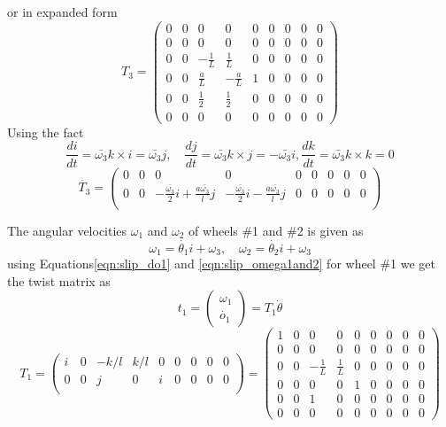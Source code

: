 {or in expanded form
\begin{equation}
\label{eqn:slip_T3}
T_3=\left(
\begin{array}{ccccccccc}
0 & 0 & 0 & 0 & 0 & 0 & 0 & 0 & 0 \\
0 & 0 & 0 & 0 & 0 & 0 & 0 & 0 & 0 \\
0 & 0 & -\frac{1}{L} & \frac{1}{L} & 0 & 0 & 0 & 0 & 0 \\
0 & 0 & \frac{a}{L} & -\frac{a}{L} & 1 & 0 & 0 & 0 & 0 \\
0 & 0 & \frac{1}{2} & \frac{1}{2} & 0 & 0 & 0 & 0 & 0 \\
0 & 0 & 0 & 0 & 0 & 0 & 0 & 0 & 0
\end{array}
\right)
\end{equation}
Using the fact \[\frac{d i}{dt}=\bar{\omega_3}k\times i =\bar{\omega_3}j, \quad  \frac{d j}{dt}=\bar{\omega_3}k\times j =-\bar{\omega_3}i, \frac{d k}{dt}=\bar{\omega_3}k\times k =0 \] 
\begin{equation}
\label{eqn:slip_dT3}
\dot{T_3}=\begin{pmatrix}
0 & 0& 0 & 0 & 0 &0 & 0 &0 &0\\
0 & 0&-\frac{ \bar{\omega_3}}{2}i +\frac{a \bar{\omega_3}}{l}j& -\frac{ \bar{\omega_3}}{2}i -\frac{a \bar{\omega_3}}{l}j & 0 &0 & 0 &0 &0\\ 
\end{pmatrix}
\end{equation}

The angular velocities $\omega_1$ and $\omega_2$ of wheels \#1 and \#2 is given as
\begin{equation}
\label{eqn:slip_omega1and2}
\omega_1=\dot{\theta_1}i+\omega_3, \quad \omega_2=\dot{\theta_2}i+\omega_3
\end{equation}
using Equations\ref{eqn:slip_do1} and \ref{eqn:slip_omega1and2} for wheel \#1 we get the twist matrix as 
\begin{equation}
\label{eqn:slip_t1}
t_1=
\begin{pmatrix}
\omega_1\\
\dot{o_1}
\end{pmatrix}=T_1 \dot{\theta}
\end{equation} 
\begin{equation}
\label{eqn:slip_T1}
T_1=
\begin{pmatrix}
i & 0& -k/l & k/l & 0 &0 & 0 &0 &0\\
0 & 0& j& 0 & i &0 & 0 &0 &0\\ 
\end{pmatrix}=
\left(
\begin{array}{ccccccccc}
1 & 0 & 0 & 0 & 0 & 0 & 0 & 0 & 0 \\
0 & 0 & 0 & 0 & 0 & 0 & 0 & 0 & 0 \\
0 & 0 & -\frac{1}{L} & \frac{1}{L} & 0 & 0 & 0 & 0 & 0 \\
0 & 0 & 0 & 0 & 1 & 0 & 0 & 0 & 0 \\
0 & 0 & 1 & 0 & 0 & 0 & 0 & 0 & 0 \\
0 & 0 & 0 & 0 & 0 & 0 & 0 & 0 & 0
\end{array}
\right)
\end{equation}

}
